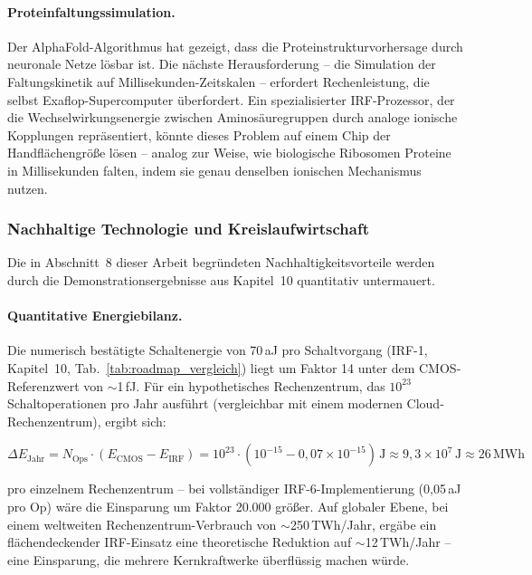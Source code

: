 ﻿\documentclass[a4paper,12pt]{scrreprt}
\theoremstyle{definition}
\begin{document}
\paragraph{Proteinfaltungssimulation.}
Der AlphaFold-Algorithmus hat gezeigt, dass die Proteinstrukturvorhersage
durch neuronale Netze lösbar ist. Die nächste Herausforderung -- die
Simulation der Faltungskinetik auf Millisekunden-Zeitskalen --
erfordert Rechenleistung, die selbst Exaflop-Supercomputer überfordert.
Ein spezialisierter IRF-Prozessor, der die Wechselwirkungsenergie zwischen
Aminosäuregruppen durch analoge ionische Kopplungen repräsentiert,
könnte dieses Problem auf einem Chip der Handflächengröße lösen --
analog zur Weise, wie biologische Ribosomen Proteine in Millisekunden
falten, indem sie genau denselben ionischen Mechanismus nutzen.

\subsubsection{Nachhaltige Technologie und Kreislaufwirtschaft}
\label{subsubsec:nachhaltigkeit}

Die in Abschnitt~8 dieser Arbeit begründeten Nachhaltigkeitsvorteile
werden durch die Demonstrationsergebnisse aus Kapitel~10 quantitativ
untermauert.

\paragraph{Quantitative Energiebilanz.}
Die numerisch bestätigte Schaltenergie von 70\,aJ pro Schaltvorgang
(IRF-1, Kapitel~10, Tab.~\ref{tab:roadmap_vergleich}) liegt um Faktor 14
unter dem CMOS-Referenzwert von $\sim$1\,fJ. Für ein hypothetisches
Rechenzentrum, das $10^{23}$ Schaltoperationen pro Jahr ausführt
(vergleichbar mit einem modernen Cloud-Rechenzentrum), ergibt sich:

\begin{equation}
	\Delta E_\text{Jahr} = N_\text{Ops} \cdot (E_\text{CMOS} - E_\text{IRF})
	= 10^{23} \cdot (10^{-15} - 0{,}07 \times 10^{-15})\,\text{J}
	\approx 9{,}3 \times 10^{7}\,\text{J} \approx 26\,\text{MWh}
	\label{eq:energieeinsparung}
\end{equation}

pro einzelnem Rechenzentrum -- bei vollständiger IRF-6-Implementierung
(0,05\,aJ pro Op) wäre die Einsparung um Faktor 20.000 größer.
Auf globaler Ebene, bei einem weltweiten Rechenzentrum-Verbrauch von
$\sim$250\,TWh/Jahr, ergäbe ein flächendeckender IRF-Einsatz eine
theoretische Reduktion auf $\sim$12\,TWh/Jahr -- eine Einsparung,
die mehrere Kernkraftwerke überflüssig machen würde.
\end{document}
